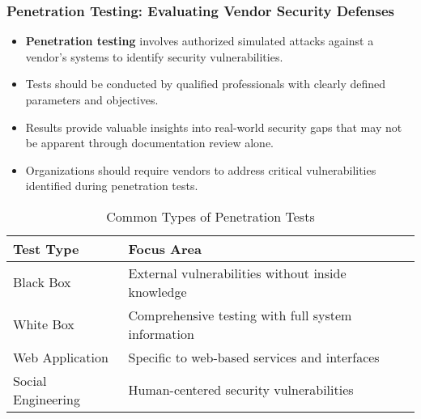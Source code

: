 \documentclass{beamer}
\begin{document}
\begin{frame}
    \frametitle{Penetration Testing: Evaluating Vendor Security Defenses}
    
    \begin{itemize}
        \item \textbf{Penetration testing} involves authorized simulated attacks against a vendor's systems to identify security vulnerabilities.
        \item Tests should be conducted by qualified professionals with clearly defined parameters and objectives.
        \item Results provide valuable insights into real-world security gaps that may not be apparent through documentation review alone.
        \item Organizations should require vendors to address critical vulnerabilities identified during penetration tests.
    \end{itemize}
    
    \begin{table}
        \centering
        \begin{tabular}{ll}
            \toprule
            \textbf{Test Type} & \textbf{Focus Area} \\
            \midrule
            Black Box & External vulnerabilities without inside knowledge \\
            White Box & Comprehensive testing with full system information \\
            Web Application & Specific to web-based services and interfaces \\
            Social Engineering & Human-centered security vulnerabilities \\
            \bottomrule
        \end{tabular}
        \caption{Common Types of Penetration Tests}
    \end{table}
\end{frame}
\end{document}
